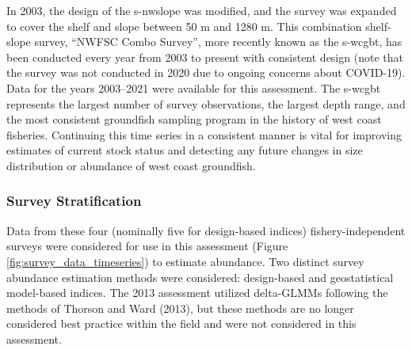 \documentclass[11pt,
  english,
  letterpaper,
]{article}
\begin{document}
In 2003, the design of the \gls{s-nwslope} was modified, and the survey was expanded to cover the shelf and slope between 50 m and 1280 m. This combination shelf-slope survey, ``NWFSC Combo Survey'', more recently known as the \gls{s-wcgbt}, has been conducted every year from 2003 to present with consistent design (note that the survey was not conducted in 2020 due to ongoing concerns about COVID-19). Data for the years 2003--2021 were available for this assessment. The \gls{s-wcgbt} represents the largest number of survey observations, the largest depth range, and the most consistent groundfish sampling program in the history of west coast fisheries. Continuing this time series in a consistent manner is vital for improving estimates of current stock status and detecting any future changes in size distribution or abundance of west coast groundfish.

\hypertarget{survey-stratification}{%
\subsubsection{Survey Stratification}\label{survey-stratification}}

Data from these four (nominally five for design-based indices) fishery-independent surveys were considered for use in this assessment (Figure \ref{fig:survey_data_timeseries}) to estimate abundance. Two distinct survey abundance estimation methods were considered: design-based and geostatistical model-based indices. The 2013 assessment utilized delta-GLMMs following the methods of Thorson and Ward (2013), but these methods are no longer considered best practice within the field and were not considered in this assessment.
\end{document}
